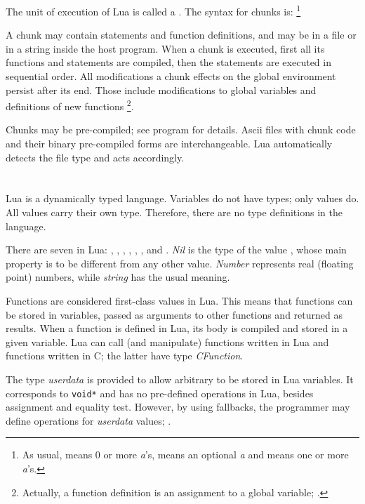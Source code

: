 The unit of execution of Lua is called a .
The syntax for chunks is:%
\footnote{As usual,  means 0 or more {\em a\/}'s,
 means an optional {\em a} and  means
one or more {\em a\/}'s.}
\begin{Produc}
\end{Produc}%
A chunk may contain statements and function definitions,
and may be in a file or in a string inside the host program.
When a chunk is executed, first all its functions and statements are compiled,
then the statements are executed in sequential order.
All modifications a chunk effects on the global environment persist
after its end.
Those include modifications to global variables and definitions
of new functions%
\footnote{Actually, a function definition is an
assignment to a global variable; .}.

Chunks may be pre-compiled; see program  for details.
Ascii files with chunk code and their binary pre-compiled forms
are interchangeable.
Lua automatically detects the file type and acts accordingly.

\section{} \label{TypesSec}

Lua is a dynamically typed language.
Variables do not have types; only values do.
All values carry their own type.
Therefore, there are no type definitions in the language.

There are seven  in Lua: , ,
, , , ,
and .
{\em Nil} is the type of the value \nil,
whose main property is to be different from any other value.
{\em Number} represents real (floating point) numbers,
while {\em string} has the usual meaning.

Functions are considered first-class values in Lua.
This means that functions can be stored in variables,
passed as arguments to other functions and returned as results.
When a function is defined in Lua, its body is compiled and stored
in a given variable.
Lua can call (and manipulate) functions written in Lua and
functions written in C; the latter have type {\em CFunction\/}.

The type {\em userdata} is provided to allow
arbitrary  to be stored in Lua variables.
It corresponds to \verb'void*' and has no pre-defined operations in Lua,
besides assignment and equality test.
However, by using fallbacks, the programmer may define operations
for {\em userdata} values; .

